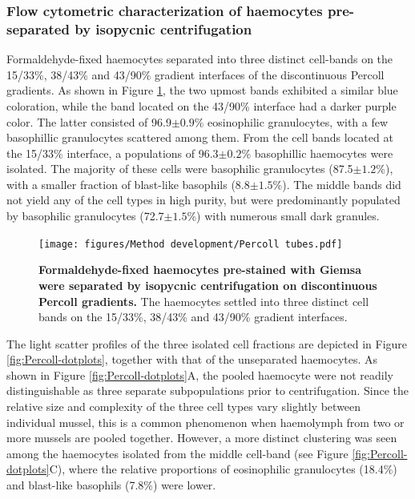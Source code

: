 \subsubsection{Flow cytometric characterization of haemocytes pre-separated by isopycnic centrifugation }
Formaldehyde-fixed haemocytes separated into three distinct cell-bands on the 15/33\%, 38/43\% and 43/90\% gradient interfaces of the discontinuous Percoll gradients. As shown in Figure \ref{fig:Percoll-tubes}, the two upmost bands exhibited a similar blue coloration, while the band located on the 43/90\% interface had a darker purple color. The latter consisted of 96.9$\pm{0.9}$\% eosinophilic granulocytes, with a few basophillic granulocytes scattered among them. From the cell bands located at the 15/33\% interface, a populations of 96.3$\pm{0.2}$\% basophillic haemocytes were isolated. The majority of these cells were basophilic granulocytes (87.5$\pm{1.2}$\%), with a smaller fraction of blast-like basophils (8.8$\pm{1.5}$\%). The middle bands did not yield any of the cell types in high purity, but were predominantly populated by basophilic granulocytes (72.7$\pm{1.5}$\%) with numerous small dark granules.

\begin{figure}[H]
    \centering
    \texttt{[image: figures/Method development/Percoll tubes.pdf]}
    \caption{\textbf{Formaldehyde-fixed haemocytes pre-stained with Giemsa were separated by isopycnic centrifugation on discontinuous Percoll gradients.} The haemocytes settled into three distinct cell bands on the 15/33\%, 38/43\% and 43/90\% gradient interfaces.}
    \label{fig:Percoll-tubes}
\end{figure}

The light scatter profiles of the three isolated cell fractions are depicted in Figure \ref{fig:Percoll-dotplots}, together with that of the unseparated haemocytes. As shown in Figure \ref{fig:Percoll-dotplots}A, the pooled haemocyte were not readily distinguishable as three separate subpopulations prior to centrifugation. Since the relative size and complexity of the three cell types vary slightly between individual mussel, this is a common phenomenon when haemolymph from two or more mussels are pooled together. However, a more distinct clustering was seen among the haemocytes isolated from the middle cell-band (see Figure \ref{fig:Percoll-dotplots}C), where the relative proportions of eosinophilic granulocytes (18.4\%) and blast-like basophils (7.8\%) were lower.

